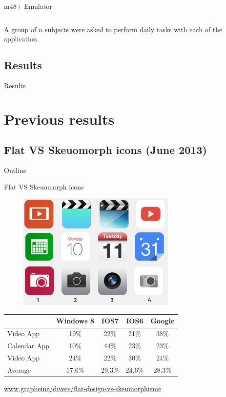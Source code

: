 \documentclass{beamer}
\begin{document}
\begin{frame}
\begin{columns}[c]
\begin{center}
    m48+ Emulator
    \end{center}
\end{columns}

A group of $n$ subjects were asked to perform daily tasks with each of the application.

\end{frame}

\subsection{Results}

\begin{frame}{Results}


\end{frame}

\section{Previous results}
\subsection{Flat VS Skeuomorph icons (June 2013)}

\begin{frame}{Outline}
    \tableofcontents[currentsection]
\end{frame}

\begin{frame}{Flat VS Skeuomorph icons}
	\begin{figure}
	\centering
	\includegraphics[scale=0.5]{flat.png}
	\end{figure}
    \begin{center}
      \begin{tabular}{|l|c|c|c|c|}
        \hline
        &Windows 8 & IOS7 & IOS6 & Google\\
        \hline
        Video App 	& 19\%	& 22\%	& 21\%	& 38\% \\
        Calendar App& 10\%	& 44\%	& 23\%	& 23\% \\
        Video App	& 24\%	& 22\%	& 30\%	& 24\% \\
        \hline
        Average		& 17.6\%& 29.3\%& 24.6\%& 28.3\% \\
        \hline
      \end{tabular}
    \end{center}
    	\begin{flushright}\tiny\url{www.grapheine/divers/flat-design-vs-skeumorphisme}\normalsize\end{flushright}
\end{frame}
\end{document}
